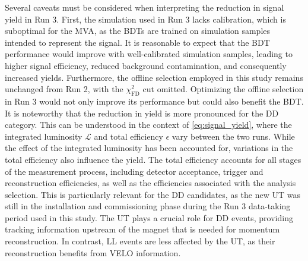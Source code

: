 Several caveats must be considered when interpreting the reduction in signal yield in Run 3. First, the simulation used in Run 3 lacks calibration, which is suboptimal for the MVA, as the BDTs are trained on simulation samples intended to represent the signal. It is reasonable to expect that the BDT performance would improve with well-calibrated simulation samples, leading to higher signal efficiency, reduced background contamination, and consequently increased yields. Furthermore, the offline selection employed in this study remains unchanged from Run 2, with the $\chi^2_{\text{FD}}$ cut omitted. Optimizing the offline selection in Run 3 would not only improve its performance but could also benefit the BDT. It is noteworthy that the reduction in yield is more pronounced for the DD category. This can be understood in the context of \cref{eq:signal_yield}, where the integrated luminosity $\mathcal{L}$ and total efficiency $\epsilon$ vary between the two runs. While the effect of the integrated luminosity has been accounted for, variations in the total efficiency also influence the yield. The total efficiency accounts for all stages of the measurement process, including detector acceptance, trigger and reconstruction efficiencies, as well as the efficiencies associated with the analysis selection. This is particularly relevant for the DD candidates, as the new UT was still in the installation and commissioning phase during the Run 3 data-taking period used in this study. The UT plays a crucial role for DD events, providing tracking information upstream of the magnet that is needed for momentum reconstruction. In contrast, LL events are less affected by the UT, as their reconstruction benefits from VELO information.

